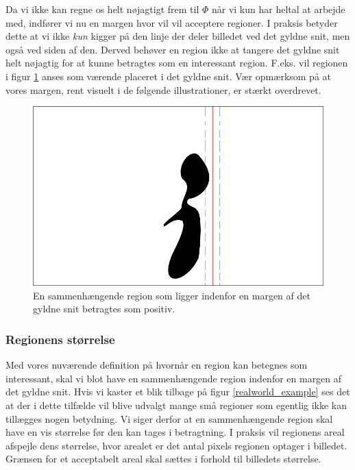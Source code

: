 {Da vi ikke kan regne os helt nøjagtigt frem til $\varPhi$ når vi
kun har heltal at arbejde med, indfører vi nu en margen hvor vil vil
acceptere regioner. I praksis betyder dette at vi ikke \emph{kun} kigger
på den linje der deler billedet ved det gyldne snit, men også ved siden
af den. Derved behøver en region ikke at tangere det gyldne snit helt
nøjagtig for at kunne betragtes som en interessant region. F.eks. vil
regionen i figur \ref{pos_naiv_margin_1} anses som værende placeret i
det gyldne snit. Vær opmærksom på at vores margen, rent visuelt i de
følgende illustrationer, er stærkt overdrevet.
\begin{figure}[h]
	\begin{center}
		\includegraphics[scale=\imgscale,angle=0]{afsnit/vores_implementation/billeder/naiv_algoritme/naiv_positiv_blob_margin_1}
	\end{center}
	\caption[Positiv region i margen]{En sammenhængende region som ligger indenfor en margen
	af det gyldne snit betragtes som positiv.}
	\label{pos_naiv_margin_1}
\end{figure}

\subsubsection{Regionens størrelse}
Med vores nuværende definition på hvornår en region kan betegnes som
interessant, skal vi blot have en sammenhængende region indenfor en
margen af det gyldne snit. Hvis vi kaster et blik tilbage på figur
\ref{realworld_example} ses det at der i dette tilfælde vil blive
udvalgt mange små regioner som egentlig ikke kan tillægges nogen
betydning. Vi siger derfor at en sammenhængende region skal have en vis
størrelse før den kan tages i betragtning. I praksis vil regionens areal
afspejle dens størrelse, hvor arealet er det antal pixels regionen
optager i billedet. Grænsen for et acceptabelt areal skal sættes i
forhold til billedets størrelse.

}
